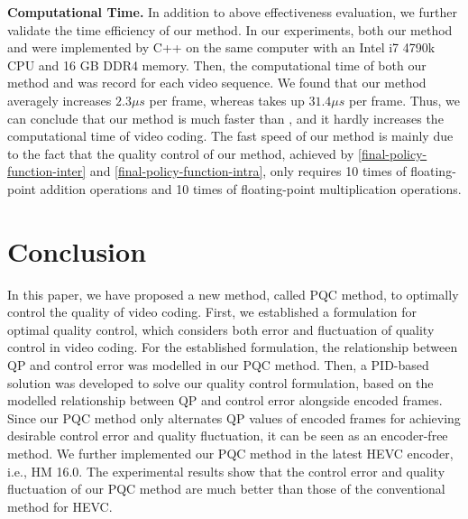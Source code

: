 \documentclass[smallabstract,smallcaptions]{dccpaper}
\begin{document}
\textbf{Computational Time.} In addition to above effectiveness evaluation, we further validate the time efficiency of our method. In our experiments,  both our method and \cite{seo2013rate} were implemented by C++ on the same computer with an Intel i7 4790k CPU and 16 GB DDR4 memory. Then, the computational time of both our method and \cite{seo2013rate} was record for each video sequence. We found that our method averagely increases $2.3 \mu s$ per frame, whereas \cite{seo2013rate} takes up $31.4 \mu s$ per frame. Thus, we can conclude that our method is much faster than \cite{seo2013rate}, and it hardly increases the computational time of video coding. The fast speed of our method is mainly due to the fact that the quality control of our method, achieved by \eqref{final-policy-function-inter} and \eqref{final-policy-function-intra}, only requires 10 times of floating-point addition operations and 10 times of floating-point multiplication operations.


\vspace{-1.0em}
\section{Conclusion}
\vspace{-1.0em}
In this paper, we have proposed a new method, called PQC method, to optimally control the quality of video coding. First, we established a formulation for optimal quality control, which considers both error and fluctuation of quality control in video coding. For the established formulation, the relationship between $\mathrm{QP}$ and control error was modelled in our PQC method. Then, a PID-based solution was developed to solve our quality control formulation, based on the modelled relationship between $\mathrm{QP}$ and control error alongside encoded frames. Since our PQC method only alternates $\mathrm{QP}$ values of encoded frames for achieving desirable control error and quality fluctuation, it can be seen as an encoder-free method. We further implemented our PQC method in the latest HEVC encoder, i.e., HM 16.0. The experimental results show that the control error and quality fluctuation of our PQC method are much better than those of the conventional method for HEVC.

\end{document}
